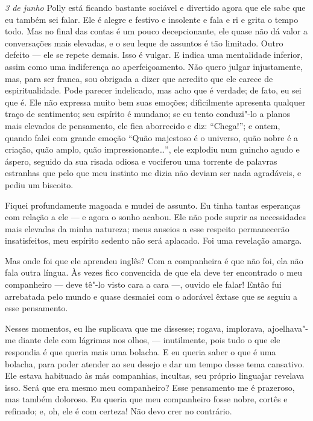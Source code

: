 \textit{3 de junho} Polly está ficando bastante sociável e divertido agora que ele sabe que eu também sei falar. Ele é alegre e festivo e insolente
e fala e ri e grita o tempo todo. Mas no final das contas é um pouco decepcionante, ele quase não dá valor a conversações mais elevadas,
e o seu leque de assuntos é tão limitado. Outro defeito --- ele se repete demais. Isso é vulgar. E indica uma mentalidade inferior, assim como
uma indiferença ao aperfeiçoamento. Não quero julgar injustamente, mas, para ser franca, sou obrigada a dizer que acredito que ele carece de
espiritualidade. Pode parecer indelicado, mas acho que é verdade; de fato, eu sei que é. Ele não expressa muito bem suas emoções; dificilmente apresenta qualquer
traço de sentimento; seu espírito é mundano; se eu tento conduzi"-lo a planos mais elevados de pensamento, ele fica
aborrecido e diz: ``Chega!''; e ontem, quando falei com grande emoção ``Quão majestoso é o universo, quão nobre é a criação, quão amplo,
quão impressionante\ldots{}'', ele explodiu num guincho agudo e áspero, seguido da sua risada odiosa e vociferou uma torrente de palavras estranhas
que pelo que meu instinto me dizia não deviam ser nada agradáveis, e pediu um biscoito.

Fiquei profundamente magoada e mudei de assunto. Eu tinha tantas esperanças com relação a ele --- e agora o sonho acabou.
Ele não pode suprir as necessidades mais elevadas da minha natureza; meus anseios a esse respeito permanecerão insatisfeitos,
meu espírito sedento não será aplacado. Foi uma revelação amarga.

Mas onde foi que ele aprendeu inglês? Com a companheira é que não foi, ela não fala outra língua. Às vezes fico convencida de que
ela deve ter encontrado o meu companheiro --- deve tê"-lo visto cara a cara ---, ouvido ele falar! Então fui arrebatada pelo mundo e quase desmaiei com
o adorável êxtase que se seguiu a esse pensamento.

Nesses momentos, eu lhe suplicava que me dissesse; rogava, implorava,
ajoelhava"-me diante dele com lágrimas nos olhos, --- inutilmente, pois tudo o
que ele respondia é que queria mais uma bolacha. E eu queria saber o que é uma
bolacha, para poder atender ao seu desejo e dar um tempo desse tema cansativo.
Ele estava habituado às más companhias, incultas, seu próprio linguajar revelava isso. Será
que era mesmo meu companheiro? Esse pensamento me é prazeroso, mas também
doloroso. Eu queria que meu companheiro fosse nobre, cortês e refinado; e, oh,
ele é com certeza! Não devo crer no contrário.

